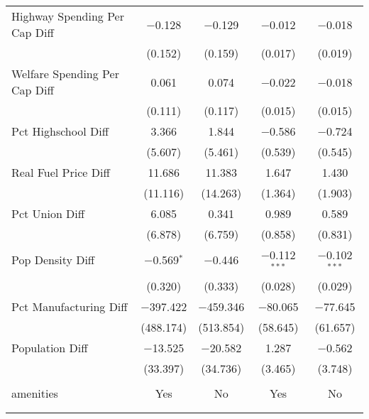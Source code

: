 \begin{table}[!htbp]
\begin{tabular}{@{\extracolsep{5pt}}lcccc}
  Highway Spending Per Cap Diff & $-$0.128 & $-$0.129 & $-$0.012 & $-$0.018 \\ 
  & (0.152) & (0.159) & (0.017) & (0.019) \\ 
  Welfare Spending Per Cap Diff & 0.061 & 0.074 & $-$0.022 & $-$0.018 \\ 
  & (0.111) & (0.117) & (0.015) & (0.015) \\ 
  Pct Highschool Diff & 3.366 & 1.844 & $-$0.586 & $-$0.724 \\ 
  & (5.607) & (5.461) & (0.539) & (0.545) \\ 
  Real Fuel Price Diff & 11.686 & 11.383 & 1.647 & 1.430 \\ 
  & (11.116) & (14.263) & (1.364) & (1.903) \\ 
  Pct Union Diff & 6.085 & 0.341 & 0.989 & 0.589 \\ 
  & (6.878) & (6.759) & (0.858) & (0.831) \\ 
  Pop Density Diff & $-$0.569$^{*}$ & $-$0.446 & $-$0.112$^{***}$ & $-$0.102$^{***}$ \\ 
  & (0.320) & (0.333) & (0.028) & (0.029) \\ 
  Pct Manufacturing Diff & $-$397.422 & $-$459.346 & $-$80.065 & $-$77.645 \\ 
  & (488.174) & (513.854) & (58.645) & (61.657) \\ 
  Population Diff & $-$13.525 & $-$20.582 & 1.287 & $-$0.562 \\ 
  & (33.397) & (34.736) & (3.465) & (3.748) \\ 
 \hline \\[-1.8ex] 
amenities & Yes & No & Yes & No \\ 
\hline \\[-1.8ex] 
\hline 
\hline \\[-1.8ex] 
\end{tabular} 
\end{table} 
